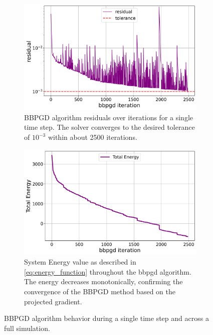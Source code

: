 \documentclass[conference]{IEEEtran}
\begin{document}
\begin{figure}[H]
    \centering
    \begin{subfigure}[b]{\linewidth}
        \centering
        \includegraphics[width=\linewidth]{figures/comparison_plots/bbpgd_residual.png}
        \caption{BBPGD algorithm residuals over iterations for a single time step. The solver converges to the desired tolerance of $10^{-3}$ within about 2500 iterations.}
        \label{fig:bbpgd_residual}
    \end{subfigure}

    \vspace{1em}

    \begin{subfigure}[b]{\linewidth}
        \centering
        \includegraphics[width=\linewidth]{figures/comparison_plots/bbpgd_total_energy.png}
        \caption{System Energy value as described in \autoref{eq:energy_function} throughout the bbpgd algorithm. The energy decreases monotonically, confirming the convergence of the BBPGD method based on the projected gradient.}
        \label{fig:bbpgd_energy}
    \end{subfigure}

    \caption{BBPGD algorithm behavior during a single time step and across a full simulation.}
\end{figure}
\end{document}
